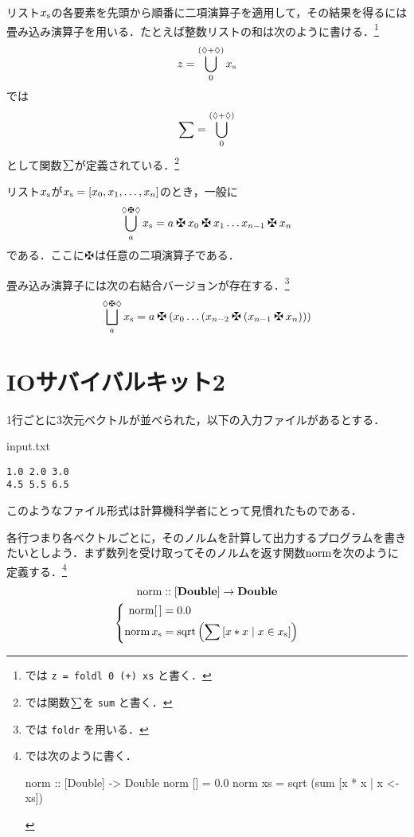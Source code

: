 \documentclass[platex,a5paper,twoside,fleqn,draft]{jsbook}
\begin{document}
リスト${x}_\mathrm{s}$の各要素を先頭から順番に二項演算子を適用して，その結果を得るには畳み込み演算子を用いる．たとえば整数リストの和は次のように書ける．\footnote{\haskell では \verb|z = foldl 0 (+) xs| と書く．}
\begin{equation}
z=\bigcup_{0}^{(\mathord{\lozenge}+\mathord{\lozenge})}{x}_\mathrm{s}
\end{equation}
\haskell では
\begin{equation}
\sum=\bigcup_{0}^{(\mathord{\lozenge}+\mathord{\lozenge})}
\end{equation}
として関数$\sum$が定義されている．\footnote{\haskell では関数$\sum$を \verb|sum| と書く．}

リスト${x}_\mathrm{s}$が${x}_\mathrm{s}=[x_0,x_1,\dots,x_n]$のとき，一般に
\begin{equation}
\mathFold{a}{\mathAnonymousParameter\mathAnonymousOperator\mathAnonymousParameter}{\mathList{x}}
=a\mathAnonymousOperator x_0\mathAnonymousOperator x_1\dots x_{n-1}\mathAnonymousOperator x_n
\end{equation}
である．ここに$\mathAnonymousOperator$は任意の二項演算子である．

畳み込み演算子には次の右結合バージョンが存在する．\footnote{\haskell では \verb|foldr| を用いる．}
\begin{equation}
\mathFoldRight{a}{\mathAnonymousParameter\mathAnonymousOperator\mathAnonymousParameter}{\mathList{x}}
=a\mathAnonymousOperator\left(x_0\dots\left(x_{n-2}\mathAnonymousOperator\left(x_{n-1}\mathAnonymousOperator x_n\right)\right)\right)
\end{equation}

\section{IOサバイバルキット2}

1行ごとに3次元ベクトルが並べられた，以下の入力ファイルがあるとする．
\begin{sourcecode}{input.txt}
\begin{verbatim}
1.0 2.0 3.0
4.5 5.5 6.5
\end{verbatim}
\end{sourcecode}
このようなファイル形式は計算機科学者にとって見慣れたものである．

各行つまり各ベクトルごとに，そのノルムを計算して出力するプログラムを書きたいとしよう．まず数列を受け取ってそのノルムを返す関数$\mathop{\textrm{norm}}$を次のように定義する．\footnote{\haskell では次のように書く．
\begin{footcode}
      norm :: [Double] -> Double
      norm [] = 0.0
      norm xs = sqrt (sum [x * x | x <- xs])
\end{footcode}}
\begin{gather}
  \mathop{\textrm{norm}}::[\mathord{\mathbf{Double}}]\rightarrow\mathord{\mathbf{Double}}\\
  \left\{
  \begin{aligned}
    \mathop{\textrm{norm}}[\,]&=0.0\\
    \mathop{\textrm{norm}}{x}_\mathrm{s}&=\mathop{\textrm{sqrt}}\left(\sum\left[x*x\mid x\in{x}_\mathrm{s}\right]\right)
  \end{aligned}
  \right.
\end{gather}
\end{document}
